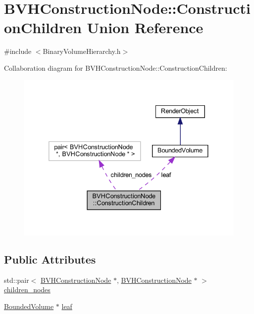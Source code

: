 \hypertarget{unionBVHConstructionNode_1_1ConstructionChildren}{}\section{B\+V\+H\+Construction\+Node\+::Construction\+Children Union Reference}
\label{unionBVHConstructionNode_1_1ConstructionChildren}


{\ttfamily \#include $<$Binary\+Volume\+Hierarchy.\+h$>$}



Collaboration diagram for B\+V\+H\+Construction\+Node\+::Construction\+Children\+:
\nopagebreak
\begin{figure}[H]
\begin{center}
\leavevmode
\includegraphics[width=332pt]{unionBVHConstructionNode_1_1ConstructionChildren__coll__graph}
\end{center}
\end{figure}
\subsection*{Public Attributes}
\begin{DoxyCompactItemize}
\item 
std\+::pair$<$ \mbox{\hyperlink{structBVHConstructionNode}{B\+V\+H\+Construction\+Node}} $\ast$, \mbox{\hyperlink{structBVHConstructionNode}{B\+V\+H\+Construction\+Node}} $\ast$ $>$ \mbox{\hyperlink{unionBVHConstructionNode_1_1ConstructionChildren_ac5e7d56943ed00d7165259481d7cb005}{children\+\_\+nodes}}
\item 
\mbox{\hyperlink{classBoundedVolume}{Bounded\+Volume}} $\ast$ \mbox{\hyperlink{unionBVHConstructionNode_1_1ConstructionChildren_abd717eefbb1140cd74ab66c49771b728}{leaf}}
\end{DoxyCompactItemize}


